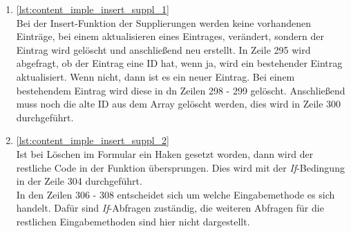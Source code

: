 \begin{enumerate}
\item \autoref{lst:content_imple_insert_suppl_1}\\
Bei der Insert-Funktion der Supplierungen werden keine vorhandenen Einträge, bei einem aktualisieren eines Eintrages, verändert, sondern der Eintrag wird gelöscht und anschließend neu erstellt. In Zeile 295 wird abgefragt, ob der Eintrag eine ID hat, wenn ja, wird ein bestehender Eintrag aktualisiert. Wenn nicht, dann ist es ein neuer Eintrag. Bei einem bestehendem Eintrag wird diese in dn Zeilen 298 - 299 gelöscht. Anschließend muss noch die alte ID aus dem Array gelöscht werden, dies wird in Zeile 300 durchgeführt. 



\item \autoref{lst:content_imple_insert_suppl_2}\\
Ist bei Löschen im Formular ein Haken gesetzt worden, dann wird der restliche Code in der Funktion übersprungen. Dies wird mit der \textit{If}-Bedingung in der Zeile 304 durchgeführt.\\
In den Zeilen 306 - 308 entscheidet sich um welche Eingabemethode es sich handelt. Dafür sind \textit{If}-Abfragen zuständig, die weiteren Abfragen für die restlichen Eingabemethoden sind hier nicht dargestellt.




\end{enumerate}
